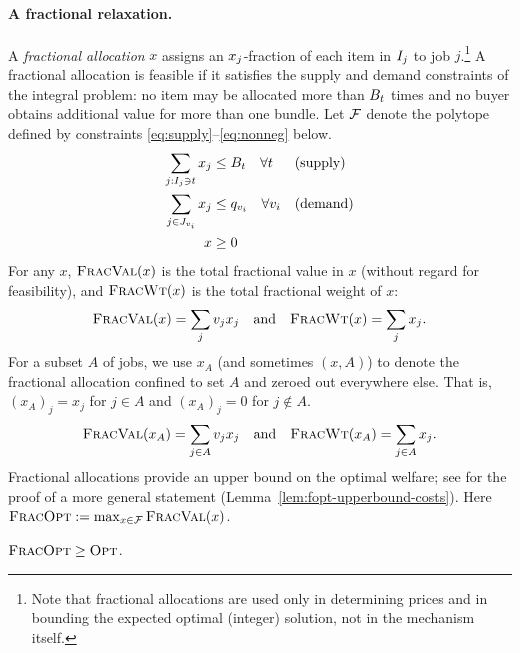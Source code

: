 \paragraph{A fractional relaxation.}
A {\em fractional allocation} $x$ assigns an ${x_{j}}$-fraction of each item in
${I_{j}}$ to job $j$.\footnote{Note that fractional allocations are used only in
determining prices and in bounding the expected optimal (integer) solution, not
in the mechanism itself.} A fractional allocation is feasible if it satisfies
the supply and demand constraints of the integral problem: no item may be
allocated more than $B_t$ times and no buyer obtains additional value for more
than one bundle. Let ${\mathcal{F}}$ denote the polytope defined by constraints 
\eqref{eq:supply}--\eqref{eq:nonneg} below. 
\begin{align}
    \hfill \sum_{j : \intj \ni t} \xj &\le \capt \quad \forall t
            & & \textrm{(supply)} \label{eq:supply} \\
    \sum_{j \in \Jvi} \xj & \le \qvi \quad \forall \vali
            & & \textrm{(demand)} \label{eq:demand} \\
    x & \ge 0 & & \label{eq:nonneg}
\end{align}
For any $x$, ${\normalfont\textsc{FracVal}}(x)$ is the total fractional value in $x$ (without
regard for feasibility), and ${\normalfont\textsc{FracWt}}(x)$ is the total fractional weight
of $x$:
\[{\normalfont\textsc{FracVal}}(x) = \sum_j v_j x_j \quad \text{and} \quad {\normalfont\textsc{FracWt}}(x) = \sum_j
  x_j.\] 
\noindent
For a subset $A$ of jobs, we use $x_A$ (and sometimes $(x,A)$) to
denote the fractional allocation confined to set $A$ and zeroed out
everywhere else. That is, $(x_A)_j = x_j$ for $j\in A$ and $(x_A)_j=0$
for $j\not\in A$.
\[{\normalfont\textsc{FracVal}}(x_A) = \sum_{j\in A} v_j x_j\quad \text{and} \quad {\normalfont\textsc{FracWt}}(x_A) = \sum_{j\in A} x_j.\]  
\noindent
Fractional allocations provide an upper bound on the optimal welfare;
see  for the proof of a more general statement
(Lemma~\ref{lem:fopt-upperbound-costs}). Here
${\normalfont\textsc{FracOpt}} := \max_{x \in {\mathcal{F}}} {\normalfont\textsc{FracVal}}(x)$.
\begin{lemma}
    \label{lem:fopt-upperbound}
    ${\normalfont\textsc{FracOpt}} \ge {\normalfont\textsc{Opt}}$.
\end{lemma}


